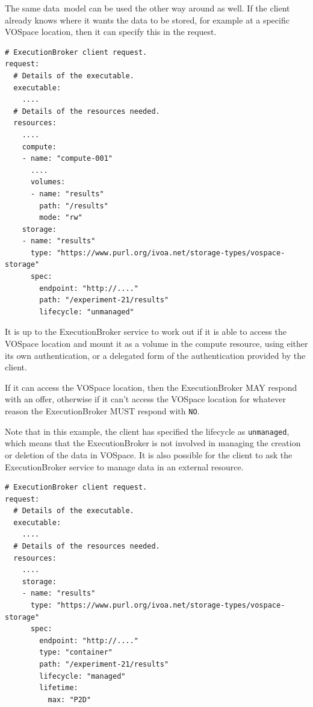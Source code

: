 \documentclass[11pt,a4paper]{ivoa}
\newcommand{\datamodel} {data~model}
\newcommand{\vospace} {VOSpace}
\newcommand{\execbrokerclass} {ExecutionBroker}
\newcommand{\codeword}[1] {\texttt{#1}}
\begin{document}
The same \datamodel{} can be used the other way around as well.
If the client already knows where it wants the data to be stored, for example at a specific
\vospace{} location, then it can specify this in the request.

\begin{lstlisting}[]
# ExecutionBroker client request.
request:
  # Details of the executable.
  executable:
    ....
  # Details of the resources needed.
  resources:
    ....
    compute:
    - name: "compute-001"
      ....
      volumes:
      - name: "results"
        path: "/results"
        mode: "rw"
    storage:
    - name: "results"
      type: "https://www.purl.org/ivoa.net/storage-types/vospace-storage"
      spec:
        endpoint: "http://...."
        path: "/experiment-21/results"
        lifecycle: "unmanaged"
\end{lstlisting}

It is up to the \execbrokerclass{} service to work out if it is able to access the
\vospace{} location and mount it as a volume in the compute resource,
using either its own authentication, or a delegated form of the authentication
provided by the client.

If it can access the \vospace{} location, then the \execbrokerclass{} MAY respond
with an offer, otherwise if it can't access the \vospace{} location for whatever
reason the \execbrokerclass{} MUST respond with \codeword{NO}.

Note that in this example, the client has specified the lifecycle as \codeword{unmanaged},
which means that the \execbrokerclass{} is not involved in managing the creation or deletion
of the data in \vospace.
It is also possible for the client to ask the \execbrokerclass{} service to manage
data in an external resource.

\begin{lstlisting}[]
# ExecutionBroker client request.
request:
  # Details of the executable.
  executable:
    ....
  # Details of the resources needed.
  resources:
    ....
    storage:
    - name: "results"
      type: "https://www.purl.org/ivoa.net/storage-types/vospace-storage"
      spec:
        endpoint: "http://...."
        type: "container"
        path: "/experiment-21/results"
        lifecycle: "managed"
        lifetime:
          max: "P2D"
\end{lstlisting}
\end{document}
